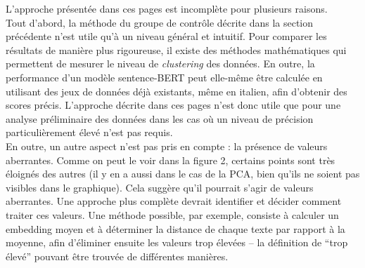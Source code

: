L'approche présentée dans ces pages est incomplète pour plusieurs raisons. \\ 
Tout d'abord, la méthode du groupe de contrôle décrite dans la section précédente n'est utile qu'à un niveau général et intuitif. Pour comparer les résultats de manière plus rigoureuse, il existe des méthodes mathématiques qui permettent de mesurer le niveau de \emph{clustering} des données. En outre, la performance d'un modèle sentence-BERT peut elle-même être calculée en utilisant des jeux de données déjà existants, même en italien, afin d'obtenir des scores précis. L'approche décrite dans ces pages n'est donc utile que pour une analyse préliminaire des données dans les cas où un niveau de précision particulièrement élevé n'est pas requis.\\

En outre, un autre aspect n'est pas pris en compte : la présence de valeurs aberrantes. Comme on peut le voir dans la figure 2, certains points sont très éloignés des autres (il y en a aussi dans le cas de la PCA, bien qu'ils ne soient pas visibles dans le graphique). Cela suggère qu'il pourrait s'agir de valeurs aberrantes. Une approche plus complète devrait identifier et décider comment traiter ces valeurs. Une méthode possible, par exemple, consiste à calculer un embedding moyen et à déterminer la distance de chaque texte par rapport à la moyenne, afin d'éliminer ensuite les valeurs trop élevées – la définition de “trop élevé” pouvant être trouvée de différentes manières. 